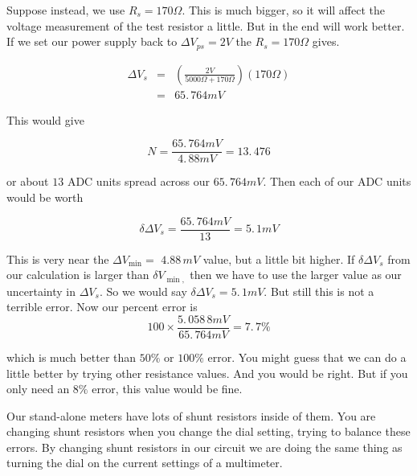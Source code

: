 Suppose instead, we use $R_{s}=170\unit{\Omega}.$  This is much bigger, so it will affect the voltage measurement of the test resistor a little. But in the end will work better. If we set our power supply back to $\Delta V_{ps}=2\unit{V}$ the $R_{s}=170\unit{\Omega}$ gives. 

\begin{eqnarray*}
	\Delta V_{s} &=&\left( \frac{2\unit{V}}{5000\unit{\Omega}+170\unit{\Omega}}\right) \left( 170\unit{\Omega}\right) \\
                 &=&65.\,\allowbreak 764\unit{mV}
\end{eqnarray*}

\noindent This would give 

\begin{equation*}
	N=\frac{65.\,\allowbreak 764\unit{mV}}{4.\,\allowbreak 88\unit{mV}}=13.\,\allowbreak 476
\end{equation*}

\noindent or about $13$ ADC units spread across our $65.\,\allowbreak 764\unit{mV}.$ Then each of our ADC units would be worth 

\begin{equation*}
	\delta \Delta V_{s}=\frac{65.\,\allowbreak 764\unit{mV}}{13}=5.\,\allowbreak1\unit{mV}
\end{equation*}

This is very near the $\Delta V_{\min }=$ $4.88\,\allowbreak \unit{mV}$ value, but a little bit higher. If $\delta \Delta V_{s}$ from our calculation is larger than $\delta V_{\min ,}$ then we have to use the larger value as our uncertainty in $\Delta V_{s}.$ So we would say $\delta \Delta V_{s}=5.\,\allowbreak 1\unit{mV}.$ But still this is not a terrible error.  Now our percent error is
\begin{equation*}
	100\times \frac{5.\,\allowbreak 058\,8\unit{mV}}{65.\,\allowbreak 764\unit{mV}}=7.\,\allowbreak 7\%
\end{equation*}

\noindent which is much better than $50\%$ or $100\%$ error. You might guess that we can do a little better by trying other resistance values. And you would be right. But if you only need an $8\%$ error, this value would be fine.

Our stand-alone meters have lots of shunt resistors inside of them. You are changing shunt resistors when you change the dial setting, trying to balance these errors. By changing shunt resistors in our circuit we are doing the same thing as turning the dial on the current settings of a multimeter.

